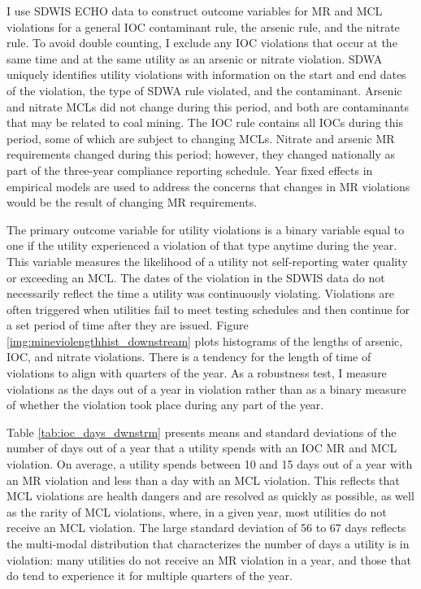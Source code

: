 \documentclass[12pt]{article}
\begin{document}
I use SDWIS ECHO data to construct outcome variables for MR and MCL violations for a general IOC contaminant rule, the arsenic rule, and the nitrate rule. To avoid double counting, I exclude any IOC violations that occur at the same time and at the same utility as an arsenic or nitrate violation. SDWA uniquely identifies utility violations with information on the start and end dates of the violation, the type of SDWA rule violated, and the contaminant. Arsenic and nitrate MCLs did not change during this period, and both are contaminants that may be related to coal mining. The IOC rule contains all IOCs during this period, some of which are subject to changing MCLs. Nitrate and arsenic MR requirements changed during this period; however, they changed nationally as part of the three-year compliance reporting schedule. Year fixed effects in empirical models are used to address the concerns that changes in MR violations would be the result of changing MR requirements. 

The primary outcome variable for utility violations is a binary variable equal to one if the utility experienced a violation of that type anytime during the year. This variable measures the likelihood of a utility not self-reporting water quality or exceeding an MCL. The dates of the violation in the SDWIS data do not necessarily reflect the time a utility was continuously violating. Violations are often triggered when utilities fail to meet testing schedules and then continue for a set period of time after they are issued. Figure \ref{img:mineviolengthhist_downstream} plots histograms of the lengths of arsenic, IOC, and nitrate violations. There is a tendency for the length of time of violations to align with quarters of the year. As a robustness test, I measure violations as the days out of a year in violation rather than as a binary measure of whether the violation took place during any part of the year.

Table \ref{tab:ioc_days_dwnstrm} presents means and standard deviations of the number of days out of a year that a utility spends with an IOC MR and MCL violation. On average, a utility spends between 10 and 15 days out of a year with an MR violation and less than a day with an MCL violation. This reflects that MCL violations are health dangers and are resolved as quickly as possible, as well as the rarity of MCL violations, where, in a given year, most utilities do not receive an MCL violation. The large standard deviation of 56 to 67 days reflects the multi-modal distribution that characterizes the number of days a utility is in violation: many utilities do not receive an MR violation in a year, and those that do tend to experience it for multiple quarters of the year. 
\end{document}
